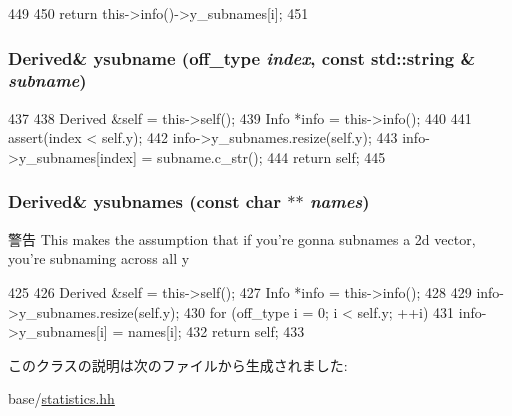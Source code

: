 \begin{DoxyCode}
449     {
450         return this->info()->y_subnames[i];
451     }
\end{DoxyCode}
\hypertarget{classStats_1_1DataWrapVec2d_ac3f960761325c75597115739290c014f}{
\subsubsection[{ysubname}]{\setlength{\rightskip}{0pt plus 5cm}Derived\& ysubname ({\bf off\_\-type} {\em index}, \/  const std::string \& {\em subname})}}
\label{classStats_1_1DataWrapVec2d_ac3f960761325c75597115739290c014f}



\begin{DoxyCode}
437     {
438         Derived &self = this->self();
439         Info *info = this->info();
440 
441         assert(index < self.y);
442         info->y_subnames.resize(self.y);
443         info->y_subnames[index] = subname.c_str();
444         return self;
445     }
\end{DoxyCode}
\hypertarget{classStats_1_1DataWrapVec2d_af87b1ae68d8479e89e6c66bbd2e0936c}{
\subsubsection[{ysubnames}]{\setlength{\rightskip}{0pt plus 5cm}Derived\& ysubnames (const char $\ast$$\ast$ {\em names})}}
\label{classStats_1_1DataWrapVec2d_af87b1ae68d8479e89e6c66bbd2e0936c}
\begin{DoxyWarning}{警告}
This makes the assumption that if you're gonna subnames a 2d vector, you're subnaming across all y 
\end{DoxyWarning}



\begin{DoxyCode}
425     {
426         Derived &self = this->self();
427         Info *info = this->info();
428 
429         info->y_subnames.resize(self.y);
430         for (off_type i = 0; i < self.y; ++i)
431             info->y_subnames[i] = names[i];
432         return self;
433     }
\end{DoxyCode}


このクラスの説明は次のファイルから生成されました:\begin{DoxyCompactItemize}
\item 
base/\hyperlink{statistics_8hh}{statistics.hh}\end{DoxyCompactItemize}
